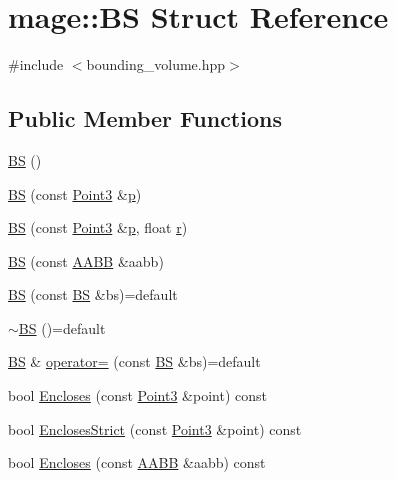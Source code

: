 \hypertarget{structmage_1_1_b_s}{}\section{mage\+:\+:BS Struct Reference}
\label{structmage_1_1_b_s}


{\ttfamily \#include $<$bounding\+\_\+volume.\+hpp$>$}

\subsection*{Public Member Functions}
\begin{DoxyCompactItemize}
\item 
\hyperlink{structmage_1_1_b_s_aa34921d9ea23b9a724ddf739b3adabfa}{BS} ()
\item 
\hyperlink{structmage_1_1_b_s_ae64c575576180fb6409125c8792c2d29}{BS} (const \hyperlink{structmage_1_1_point3}{Point3} \&\hyperlink{structmage_1_1_b_s_a9c6ad8f37fa6b98179e8108c8584fdcf}{p})
\item 
\hyperlink{structmage_1_1_b_s_a23be36778ebc6b31fcfb31fb032fdb0e}{BS} (const \hyperlink{structmage_1_1_point3}{Point3} \&\hyperlink{structmage_1_1_b_s_a9c6ad8f37fa6b98179e8108c8584fdcf}{p}, float \hyperlink{structmage_1_1_b_s_ab2e786e8493feb28a3bc0216e8dea5bc}{r})
\item 
\hyperlink{structmage_1_1_b_s_adb709aad7bd4b6816ae59ec87221bd6a}{BS} (const \hyperlink{structmage_1_1_a_a_b_b}{A\+A\+BB} \&aabb)
\item 
\hyperlink{structmage_1_1_b_s_a01cf5aaeae2a87c56527a338889f5079}{BS} (const \hyperlink{structmage_1_1_b_s}{BS} \&bs)=default
\item 
\hyperlink{structmage_1_1_b_s_a111f60f8ab53c7497ff7aaa743619829}{$\sim$\+BS} ()=default
\item 
\hyperlink{structmage_1_1_b_s}{BS} \& \hyperlink{structmage_1_1_b_s_aef60d898cb44bbf1e3988351b5717faa}{operator=} (const \hyperlink{structmage_1_1_b_s}{BS} \&bs)=default
\item 
bool \hyperlink{structmage_1_1_b_s_a1298419385ad961cd68deb2ec049879d}{Encloses} (const \hyperlink{structmage_1_1_point3}{Point3} \&point) const
\item 
bool \hyperlink{structmage_1_1_b_s_ad08a02ebf76d2b3a5903c9c69a0e80e1}{Encloses\+Strict} (const \hyperlink{structmage_1_1_point3}{Point3} \&point) const
\item 
bool \hyperlink{structmage_1_1_b_s_af6139a592c9d95ae0f1162a9f2e485d1}{Encloses} (const \hyperlink{structmage_1_1_a_a_b_b}{A\+A\+BB} \&aabb) const

\end{DoxyCompactItemize}

